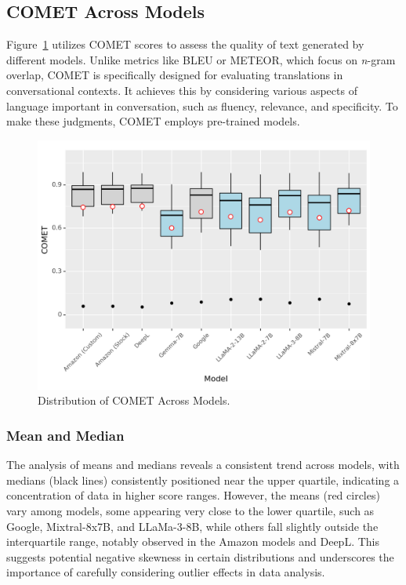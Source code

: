\subsection{COMET Across Models}

Figure~\ref{fig: comet-models} utilizes COMET scores to assess the quality of text generated by different models. Unlike metrics like BLEU or METEOR, which focus on \emph{n}-gram overlap, COMET is specifically designed for evaluating translations in conversational contexts. It achieves this by considering various aspects of language important in conversation, such as fluency, relevance, and specificity. To make these judgments, COMET employs pre-trained models.

\begin{figure}[htb]
        \centering
        \includegraphics[width=.9\textwidth]{textual/Figuras/Results/Unknown-94.png}
        \caption{Distribution of COMET Across Models.}
        \label{fig: comet-models}
\end{figure}


\subsubsection{Mean and Median}

The analysis of means and medians reveals a consistent trend across models, with medians (black lines) consistently positioned near the upper quartile, indicating a concentration of data in higher score ranges. However, the means (red circles) vary among models, some appearing very close to the lower quartile, such as Google, Mixtral-8x7B, and LLaMa-3-8B, while others fall slightly outside the interquartile range, notably observed in the Amazon models and DeepL. This suggests potential negative skewness in certain distributions and underscores the importance of carefully considering outlier effects in data analysis.



